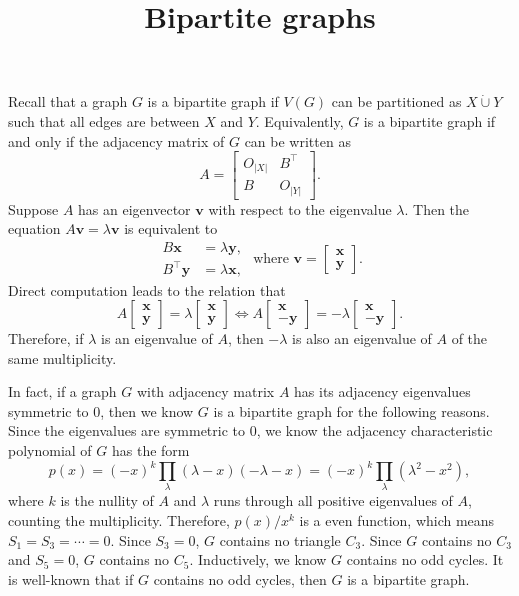 \documentclass{article}
\title{Bipartite graphs}
\date{\vspace{-1cm}}
\newcommand{\trans}{^\top}
\newcommand{\dunion}{\mathbin{\dot\cup}}
\newcommand{\bx}{\mathbf{x}}
\newcommand{\by}{\mathbf{y}}
\newcommand{\bv}{\mathbf{v}}
\theoremstyle{definition}
\begin{document}
\maketitle
\large

Recall that a graph $G$ is a bipartite graph if $V(G)$ can be partitioned as $X\dunion Y$ such that all edges are between $X$ and $Y$.  Equivalently, $G$ is a bipartite graph if and only if the adjacency matrix of $G$ can be written as 
\[A = \begin{bmatrix}
 O_{|X|} & B\trans \\
 B & O_{|Y|}
\end{bmatrix}.\]
Suppose $A$ has an eigenvector $\bv$ with respect to the eigenvalue $\lambda$.  Then the equation $A\bv = \lambda\bv$ is equivalent to 
\[\begin{aligned}
B\bx &= \lambda\by, \\
B\trans\by &= \lambda\bx,
\end{aligned} \text{ where } 
\bv = \begin{bmatrix} \bx \\ \by \end{bmatrix}.\]
Direct computation leads to the relation that 
\[A\begin{bmatrix} \bx \\ \by \end{bmatrix} = \lambda\begin{bmatrix} \bx \\ \by \end{bmatrix} \iff 
A\begin{bmatrix} \bx \\ -\by \end{bmatrix} = -\lambda\begin{bmatrix} \bx \\ -\by \end{bmatrix}.\]
Therefore, if $\lambda$ is an eigenvalue of $A$, then $-\lambda$ is also an eigenvalue of $A$ of the same multiplicity.  

In fact, if a graph $G$ with adjacency matrix $A$ has its adjacency eigenvalues symmetric to $0$, then we know $G$ is a bipartite graph for the following reasons.  Since the eigenvalues are symmetric to $0$, we know the adjacency characteristic polynomial of $G$ has the form 
\[p(x) = (-x)^k\prod_{\lambda}(\lambda - x)(-\lambda - x) = (-x)^k\prod_{\lambda}(\lambda^2 - x^2),\]
where $k$ is the nullity of $A$ and $\lambda$ runs through all positive eigenvalues of $A$, counting the multiplicity.  Therefore, $p(x) / x^k$ is a even function,  which means $S_1 = S_3 = \cdots = 0$.  Since $S_3 = 0$, $G$ contains no triangle $C_3$.  Since $G$ contains no $C_3$ and $S_5 = 0$, $G$ contains no $C_5$.  Inductively, we know $G$ contains no odd cycles.  It is well-known that if $G$ contains no odd cycles, then $G$ is a bipartite graph.
\end{document}
